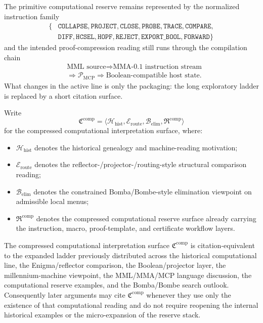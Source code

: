 The primitive computational reserve remains represented by the normalized instruction family
\[
\begin{aligned}
\{&\texttt{COLLAPSE},\texttt{PROJECT},\texttt{CLOSE},\texttt{PROBE},\texttt{TRACE},\texttt{COMPARE},\\
&\texttt{DIFF},\texttt{HCSEL},\texttt{HOPF},\texttt{REJECT},\texttt{EXPORT\_BOOL},\texttt{FORWARD}\}
\end{aligned}
\]
and the intended proof-compression reading still runs through the compilation chain
\[
\begin{aligned}
&\text{MML source}
\Longrightarrow \text{MMA-0.1 instruction stream}\\
&\Longrightarrow \mathcal P_{\mathrm{MCP}}
\Longrightarrow \text{Boolean-compatible host state}.
\end{aligned}
\]
What changes in the active line is only the packaging: the long exploratory ladder is replaced by a short citation surface.

\begin{definition}
Write
\[
\mathfrak C^{\mathrm{comp}}
=
\langle
\mathcal H_{\mathrm{hist}},
\mathcal E_{\mathrm{route}},
\mathcal B_{\mathrm{elim}},
\mathfrak R^{\mathrm{comp}}
\rangle
\]
for the compressed computational interpretation surface, where:
\begin{itemize}[leftmargin=2em]
    \item $\mathcal H_{\mathrm{hist}}$ denotes the historical genealogy and machine-reading motivation;
    \item $\mathcal E_{\mathrm{route}}$ denotes the reflector-/projector-/routing-style structural comparison reading;
    \item $\mathcal B_{\mathrm{elim}}$ denotes the constrained Bomba/Bombe-style elimination viewpoint on admissible local menus;
    \item $\mathfrak R^{\mathrm{comp}}$ denotes the compressed computational reserve surface already carrying the instruction, macro, proof-template, and certificate workflow layers.
\end{itemize}
\end{definition}

\begin{proposition}
The compressed computational interpretation surface $\mathfrak C^{\mathrm{comp}}$ is citation-equivalent to the expanded ladder previously distributed across the historical computational line, the Enigma/reflector comparison, the Boolean/projector layer, the millennium-machine viewpoint, the MML/MMA/MCP language discussion, the computational reserve examples, and the Bomba/Bombe search outlook. Consequently later arguments may cite $\mathfrak C^{\mathrm{comp}}$ whenever they use only the existence of that computational reading and do not require reopening the internal historical examples or the micro-expansion of the reserve stack.
\end{proposition}

